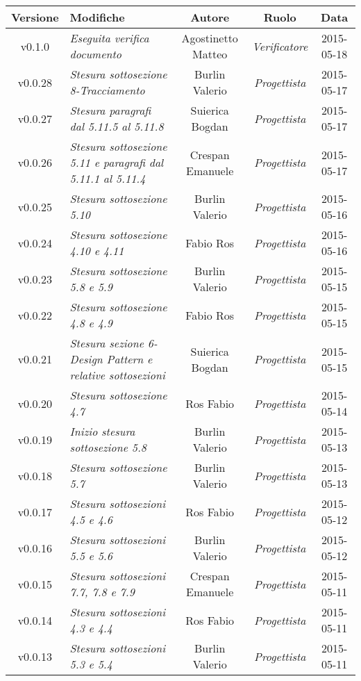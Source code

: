 \newpage

\begin{table}[h]
\centering
\begin{tabular}{|c|p{}|c|c|c|}
	\toprule
	\textbf{Versione} & \textbf{Modifiche} & \textbf{Autore} & \textbf{Ruolo} & \textbf{Data} \\
	\midrule
	\midrule
		v0.1.0 & \textit{Eseguita verifica documento} & Agostinetto Matteo & \textit{Verificatore} & 2015-05-18\\
	\midrule
		v0.0.28 & \textit{Stesura sottosezione 8-Tracciamento} & Burlin Valerio & \textit{Progettista} & 2015-05-17\\
	\midrule
		v0.0.27 & \textit{Stesura paragrafi dal 5.11.5 al 5.11.8} & Suierica Bogdan & \textit{Progettista} & 2015-05-17\\
	\midrule
		v0.0.26 & \textit{Stesura sottosezione 5.11 e paragrafi dal 5.11.1 al 5.11.4} & Crespan Emanuele & \textit{Progettista} & 2015-05-17\\
	\midrule
		v0.0.25 & \textit{Stesura sottosezione 5.10} & Burlin Valerio & \textit{Progettista} & 2015-05-16\\
	\midrule
		v0.0.24 & \textit{Stesura sottosezione 4.10 e 4.11} & Fabio Ros & \textit{Progettista} & 2015-05-16\\
	\midrule
		v0.0.23 & \textit{Stesura sottosezione 5.8 e 5.9} & Burlin Valerio & \textit{Progettista} & 2015-05-15\\
	\midrule
		v0.0.22 & \textit{Stesura sottosezione 4.8 e 4.9} & Fabio Ros & \textit{Progettista} & 2015-05-15\\
	\midrule
		v0.0.21 & \textit{Stesura sezione 6-Design Pattern e relative sottosezioni} & Suierica Bogdan & \textit{Progettista} & 2015-05-15\\
	\midrule
		v0.0.20 & \textit{Stesura sottosezione 4.7} & Ros Fabio & \textit{Progettista} & 2015-05-14\\
	\midrule
		v0.0.19 & \textit{Inizio stesura sottosezione 5.8} & Burlin Valerio & \textit{Progettista} & 2015-05-13\\
	\midrule
		v0.0.18 & \textit{Stesura sottosezione 5.7} & Burlin Valerio & \textit{Progettista} & 2015-05-13\\
	\midrule
		v0.0.17 & \textit{Stesura sottosezioni 4.5 e 4.6} & Ros Fabio & \textit{Progettista} & 2015-05-12\\
	\midrule
		v0.0.16 & \textit{Stesura sottosezioni 5.5 e 5.6} & Burlin Valerio & \textit{Progettista} & 2015-05-12\\
	\midrule
		v0.0.15 & \textit{Stesura sottosezioni 7.7, 7.8 e 7.9} & Crespan Emanuele & \textit{Progettista} & 2015-05-11\\
	\midrule
		v0.0.14 & \textit{Stesura sottosezioni 4.3 e 4.4} & Ros Fabio & \textit{Progettista} & 2015-05-11\\
	\midrule
		v0.0.13 & \textit{Stesura sottosezioni 5.3 e 5.4} & Burlin Valerio & \textit{Progettista} & 2015-05-11\\
	\bottomrule
\end{tabular}
\end{table}

